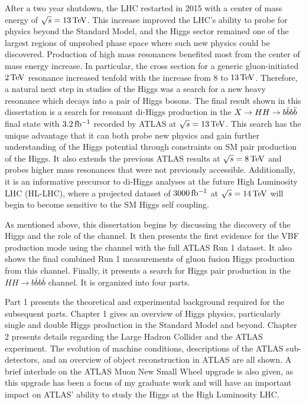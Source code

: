 After a two year shutdown, the LHC restarted in 2015 with a center of mass energy of $\sqrt{s} = 13 \TeV$. This increase improved the LHC's ability to probe for physics beyond the Standard Model, and the Higgs sector remained one of the largest regions of unprobed phase space where such new physics could be discovered. Production of high mass resonances benefited most from the center of mass energy increase. In particular, the cross section for a generic gluon-initiated $2 \TeV$ resonance increased tenfold with the increase from $8$ to $13 \TeV$. Therefore, a natural next step in studies of the Higgs was a search for a new heavy resonance which decays into a pair of Higgs bosons. The final result shown in this dissertation is a search for resonant di-Higgs production in the $X\to HH \to b\bar{b}b\bar{b}$ final state with $3.2 \mbox{\,fb$^{-1}$}$ recorded by ATLAS at $\sqrt{s} = 13 \TeV$. This search has the unique advantage that it can both probe new physics and gain further understanding of the Higgs potential through constraints on SM pair production of the Higgs. It also extends the previous ATLAS results at $\sqrt{s} = 8 \TeV$ and probes higher mass resonances that were not previously accessible. Additionally, it is an informative precursor to di-Higgs analyses at the future High Luminosity LHC (HL-LHC), where a projected dataset of $3000 \mbox{\,fb$^{-1}$}$ at $\sqrt{s} = 14 \TeV$ will begin to become sensitive to the SM Higgs self coupling. 

As mentioned above, this dissertation begins by discussing the discovery of the Higgs and the role of the \HWWfull channel. It then presents the first evidence for the VBF production mode using the \HWWfull channel with the full ATLAS Run 1 dataset. It also shows the final combined Run 1 measurements of gluon fusion Higgs production from this channel. Finally, it presents a search for Higgs pair production in the $HH\to b\bar{b}b\bar{b}$ channel. It is organized into four parts. 

Part 1 presents the theoretical and experimental background required for the subsequent parts. Chapter 1 gives an overview of Higgs physics, particularly single and double Higgs production in the Standard Model and beyond. Chapter 2 presents details regarding the Large Hadron Collider and the ATLAS experiment. The evolution of machine conditions, descriptions of the ATLAS sub-detectors, and an overview of object reconstruction in ATLAS are all shown. A brief interlude on the ATLAS Muon New Small Wheel upgrade is also given, as this upgrade has been a focus of my graduate work and will have an important impact on ATLAS' ability to study the Higgs at the High Luminosity LHC. 

